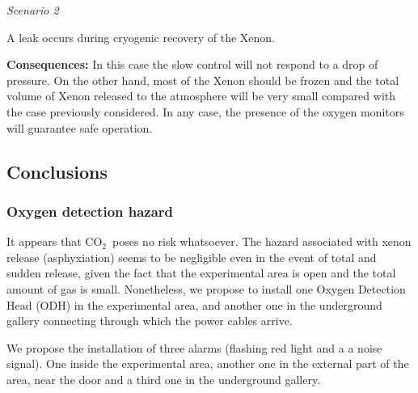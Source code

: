 \textit{Scenario 2}
 
 A leak occurs during cryogenic recovery of the Xenon. 
 
 \textbf{Consequences:} In this case the slow control will not respond to a drop of pressure. On the other hand, most of the Xenon should be frozen and the total volume of Xenon released to the atmosphere will be very small compared with the case previously considered. In any case, the presence of the oxygen monitors will guarantee safe operation. 
 

\subsection{Conclusions}

\subsubsection{Oxygen detection hazard}

It appears that CO$_2$~poses no risk whatsoever. The hazard associated with xenon release (asphyxiation) seems to be negligible even in the event of total and sudden release, given the fact that the experimental area is open and the total amount of gas is small. Nonetheless, we propose to install one Oxygen Detection Head (ODH) in the experimental area, and another one in the underground gallery connecting through which the power cables arrive. 

We propose the installation of three alarms (flashing red light and a a noise signal). One inside the experimental area, another one in the external part of the area, near the door and a third one in the underground gallery. 
